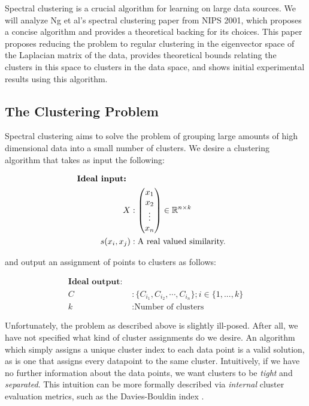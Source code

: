 Spectral clustering is a crucial algorithm for learning on large data sources.
We will analyze Ng et al's \cite{ng2002spectral} spectral clustering paper from
NIPS 2001, which proposes a concise algorithm and provides a theoretical
backing for its choices. This paper proposes reducing the problem to regular
clustering in the eigenvector space of the Laplacian matrix of the data,
provides theoretical bounds relating the clusters in this space to clusters in
the data space, and shows initial experimental results using this algorithm.

\subsection{The Clustering Problem}
Spectral clustering aims to solve the problem of grouping large amounts of high
dimensional data into a small number of clusters. We desire a clustering
algorithm that takes as input the following:

\begin{align*}
\textbf{Ideal input: } \label{clustering:idealinput} \\
X &: \begin{pmatrix}
        x_1 \\
        x_2 \\
        \vdots \\
        x_n
     \end{pmatrix} \in \mathbb{R}^{n \times k} \\
s(x_i, x_j) &: \text{A real valued similarity.}
\end{align*}

and output an assignment of points to clusters as follows:

\begin{align*}
    \textbf{Ideal output: } \\
C &: \{ C_{i_1}, C_{i_2}, \cdots, C_{i_n} \} ; i \in \{1,...,k\} \\
k &: \text{Number of clusters}
\end{align*}

Unfortunately, the problem as described above is slightly ill-posed.
After all, we have not specified what kind of cluster assignments do we desire.
An algorithm which simply assigns a unique cluster index to each data point is
a valid solution, as is one that assigns every datapoint to the same cluster.
Intuitively, if we have no further information about the data points, we want
clusters to be \textit{tight} and \textit{separated}. This intuition can be more
formally described via \textit{internal} cluster evaluation metrics, such as the
Davies-Bouldin index \cite{davies1979cluster}.

